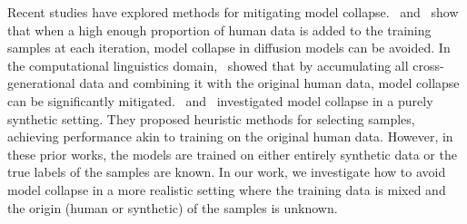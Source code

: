 %
Recent studies have explored methods for mitigating model collapse. \citet{bertrand2024on}~and~\citet{alemohammad_self-consuming_2023} show that when a high enough proportion of human data is added to the training samples at each iteration, model collapse in diffusion models can be avoided. In the computational linguistics domain,~\citet{gerstgrasser_is_2024} showed that by accumulating all cross-generational data and combining it with the original human data, model collapse can be significantly mitigated. \citet{feng_beyond_2024}~and~\citet{zhang_regurgitative_2024} investigated model collapse in a purely synthetic setting. They proposed heuristic methods for selecting samples, achieving performance akin to training on the original human data. However, in these prior works, the models are trained on either entirely synthetic data or the true labels of the samples are known. In our work, we investigate how to avoid model collapse in a more realistic setting where the training data is mixed and the origin (human or synthetic) of the samples 
is unknown.